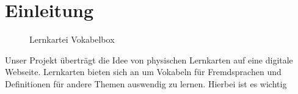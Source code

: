 \section{Einleitung}
\begin{figure}[h!]
  \centering
  \caption[Lernkartei Vokabelbox]{Lernkartei Vokabelbox\footnotemark}
\end{figure}

Unser Projekt überträgt die Idee von physischen Lernkarten auf eine digitale Webseite. Lernkarten bieten sich an um Vokabeln für Fremdsprachen und Definitionen für andere Themen auswendig zu lernen. Hierbei ist es wichtig 